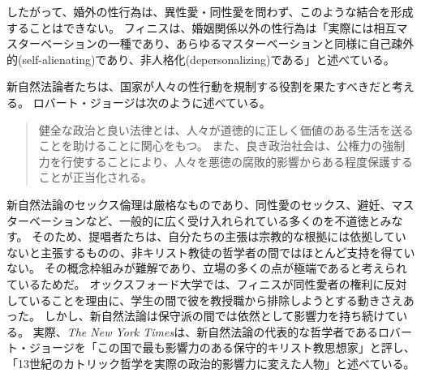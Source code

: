 \documentclass[paper=a4,book,openany]{jlreq}
\begin{document}
したがって、婚外の性行為は、異性愛・同性愛を問わず、このような結合を形成することはできない。
フィニスは、婚姻関係以外の性行為は「実際には相互マスターベーションの一種であり、あらゆるマスターベーションと同様に自己疎外的(self-alienating)であり、非人格化(depersonalizing)である」と述べている\citep[p.1066]{finnis94:_law_moral_sexual_orien}。

新自然法論者たちは、国家が人々の性行動を規制する役割を果たすべきだと考える。
ロバート・ジョージは次のように述べている。

\begin{quote}
健全な政治と良い法律とは、人々が道徳的に正しく価値のある生活を送ることを助けることに関心をもつ。
また、良き政治社会は、公権力の強制力を行使することにより、人々を悪徳の腐敗的影響からある程度保護することが正当化される。
\citep[p.20]{george93:_makin_men_moral}
\end{quote}

新自然法論のセックス倫理は厳格なものであり、同性愛のセックス、避妊、マスターベーションなど、一般的に広く受け入れられている多くのを不道徳とみなす。
そのため、提唱者たちは、自分たちの主張は宗教的な根拠には依拠していないと主張するものの、非キリスト教徒の哲学者の間ではほとんど支持を得ていない。
その概念枠組みが難解であり、立場の多くの点が極端であると考えられているためだ。
オックスフォード大学では、フィニスが同性愛者の権利に反対していることを理由に、学生の間で彼を教授職から排除しようとする動きさえあった\citep{benn19:_we_dont_think_john_finnis}。
しかし、新自然法論は保守派の間では依然として影響力を持ち続けている。
実際、\emph{The New York Times}は、新自然法論の代表的な哲学者であるロバート・ジョージを「この国で最も影響力のある保守的キリスト教思想家」と評し、「13世紀のカトリック哲学を実際の政治的影響力に変えた人物」と述べている\citep{kirkpatrick09:_conser_chris_big_think}。
\end{document}
